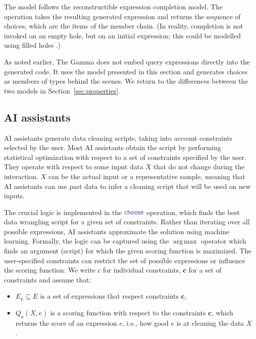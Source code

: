 \documentclass[nonacm,anonymous,sigplan,screen]{acmart}
\newcommand{\ident}[1]{\textsf{\color{DarkSlateBlue}{#1}}}
\newcommand{\select}{\textnormal{\ident{choose}}}
\DeclareMathOperator{\argmax}{arg\,max}
\begin{document}
The model follows the reconstructible expression completion model. The \ident{decode} operation
takes the resulting generated expression and returns the sequence of choices, which are the
items of the member chain. (In reality, completion is not invoked on an empty hole, but
on an initial expression; this could be modelled using filled holes \cite{omar-2019-holes}.)

As noted earlier, The Gamma does not embed query expressions directly into the generated code.
It uses the model presented in this section and generates choices as members of
types behind the scenes. We return to the differences between the two models in
Section~\ref{sec:properties}.


\subsection{AI assistants}
\label{sec:examples-aias}

AI assistants generate data cleaning scripts, taking into account constraints selected by the user.
Most AI assistants obtain the script by performing statistical optimization with respect
to a set of constraints specified by the user\cite{petricek-2023-aias}. They operate
with respect to some input data $X$ that do not change during the interaction.
$X$ can be the actual input or a representative sample, meaning that AI assistants
can use past data to infer a cleaning script that will be used on new inputs.

The crucial logic is implemented in the
$\select$ operation, which finds the best data wrangling script for a given set of constraints.
Rather than iterating over all possible expressions, AI assistants approximate the solution using
machine learning. Formally, the logic can be captured using the $\argmax$ operator which
finds an argument (script) for which the given scoring function is maximized.
The user-specified constraints can restrict the set of possible expressions or influence
the scoring function. We write $c$ for individual constraints, $\boldsymbol{c}$ for a set of
constraints and assume that:

\begin{itemize}
\item $E_{\boldsymbol{c}}\subseteq E$ is a set of expressions that respect constraints $\boldsymbol{c}$,
\item $Q_{\boldsymbol{c}}(X, e)$ is a scoring function with respect to the constraints $\boldsymbol{c}$,
  which returns the score of an expression $e$, i.e., how good $e$ is at cleaning the data $X$.
\end{itemize}
\end{document}
